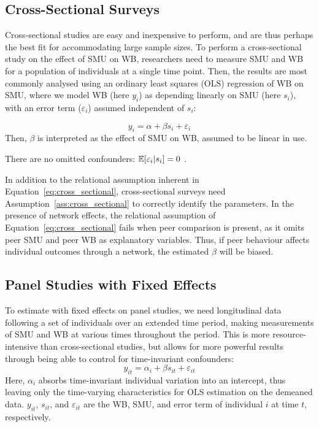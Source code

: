\subsection{Cross-Sectional Surveys}
\label{sec:intro:cross_sectional}
Cross-sectional studies are easy and inexpensive to perform, and are thus perhaps the best fit for accommodating large sample sizes. To perform a cross-sectional study on the effect of SMU on WB, researchers need to measure SMU and WB for a population of individuals at a single time point. Then, the results are most commonly analysed using an ordinary least squares (OLS) regression of WB on SMU, where we model WB (here $y_i$) as depending linearly on SMU (here $s_i$), with an error term ($\varepsilon_i$) assumed independent of $s_i$:

\begin{equation}
    y_i = \alpha + \beta s_i + \varepsilon_i
    \label{eq:cross_sectional}
\end{equation}
Then, $\beta$ is interpreted as the effect of SMU on WB, assumed to be linear in use.

\begin{assumption}
    \label{ass:cross_sectional}
    There are no omitted confounders: $\mathbb{E}[\varepsilon_i |  s_i] = 0$ \parencite[Eq.~4.3]{Wooldridge2010}.
\end{assumption}

In addition to the relational assumption inherent in Equation~\eqref{eq:cross_sectional}, cross-sectional surveys need Assumption~\ref{ass:cross_sectional} to correctly identify the parameters. In the presence of network effects, the relational assumption of Equation~\eqref{eq:cross_sectional} fails when peer comparison is present, as it omits peer SMU and peer WB as explanatory variables. Thus, if peer behaviour affects individual outcomes through a network, the estimated $\hat{\beta}$ will be biased.

\subsection{Panel Studies with Fixed Effects}
\label{sec:intro:panel}
To estimate with fixed effects on panel studies, we need longitudinal data following a set of individuals over an extended time period, making measurements of SMU and WB at various times throughout the period. This is more resource-intensive than cross-sectional studies, but allows for more powerful results through being able to control for time-invariant confounders:
\begin{equation}
    y_{it} = \alpha_i + \beta s_{it} + \varepsilon_{it}
    \label{eq:panel}
\end{equation}
Here, $\alpha_i$ absorbs time-invariant individual variation into an intercept, thus leaving only the time-varying characteristics for OLS estimation on the demeaned data. $y_{it}$, $s_{it}$, and $\varepsilon_{it}$ are the WB, SMU, and error term of individual $i$ at time $t$, respectively.

